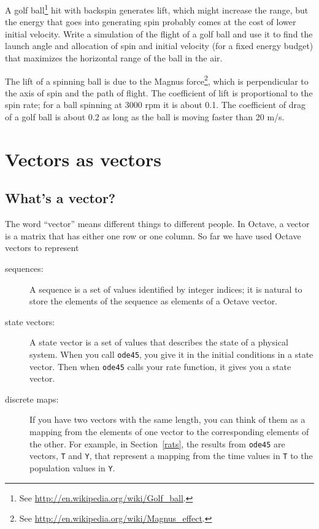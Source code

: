 \documentclass{book}
\begin{document}
\begin{ex}
\label{golf}

A golf ball\footnote{See
\url{http://en.wikipedia.org/wiki/Golf_ball}.} hit with backspin
generates lift, which might increase the range, but the energy that
goes into generating spin probably comes at the cost of lower initial
velocity. Write a simulation of the flight of a golf ball and use it
to find the launch angle and allocation of spin and initial velocity
(for a fixed energy budget) that maximizes the horizontal range of the
ball in the air.

The lift of a spinning ball is due to the Magnus force\footnote{See
\url{http://en.wikipedia.org/wiki/Magnus_effect}.}, which is
perpendicular to the axis of spin and the path of flight. The
coefficient of lift is proportional to the spin rate; for a ball
spinning at 3000 rpm it is about 0.1. The coefficient of drag of a
golf ball is about 0.2 as long as the ball is moving faster than 20 m/s.
\end{ex}



\chapter{Vectors as vectors}

\section{What's a vector?}

The word ``vector'' means different things to different people.
In Octave, a vector is a matrix that has either one row or one
column. So far we have used Octave vectors to represent

\begin{description}

\item[sequences:] A sequence is a set of values identified by
integer indices; it is natural to store the elements of the
sequence as elements of a Octave vector.

\item[state vectors:] A state vector is a set of values that
describes the state of a physical system. When you call
{\tt ode45}, you give it in the initial conditions in a state
vector. Then when {\tt ode45} calls your rate function, it
gives you a state vector.

\item[discrete maps:] If you have two vectors with the same
length, you can think of them as a mapping from the elements
of one vector to the corresponding elements of the other. For
example, in Section~\ref{rats}, the results from {\tt ode45}
are vectors, {\tt T} and {\tt Y}, that represent a mapping
from the time values in {\tt T} to the population values in {\tt Y}.

\end{description}
\end{document}
